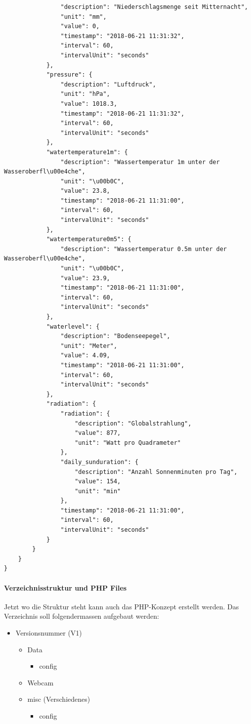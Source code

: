 \begin{lstlisting}
				"description": "Niederschlagsmenge seit Mitternacht",
				"unit": "mm",
				"value": 0,
				"timestamp": "2018-06-21 11:31:32",
				"interval": 60,
				"intervalUnit": "seconds"
			},
			"pressure": {
				"description": "Luftdruck",
				"unit": "hPa",
				"value": 1018.3,
				"timestamp": "2018-06-21 11:31:32",
				"interval": 60,
				"intervalUnit": "seconds"
			},
			"watertemperature1m": {
				"description": "Wassertemperatur 1m unter der Wasseroberfl\u00e4che",
				"unit": "\u00b0C",
				"value": 23.8,
				"timestamp": "2018-06-21 11:31:00",
				"interval": 60,
				"intervalUnit": "seconds"
			},
			"watertemperature0m5": {
				"description": "Wassertemperatur 0.5m unter der Wasseroberfl\u00e4che",
				"unit": "\u00b0C",
				"value": 23.9,
				"timestamp": "2018-06-21 11:31:00",
				"interval": 60,
				"intervalUnit": "seconds"
			},
			"waterlevel": {
				"description": "Bodenseepegel",
				"unit": "Meter",
				"value": 4.09,
				"timestamp": "2018-06-21 11:31:00",
				"interval": 60,
				"intervalUnit": "seconds"
			},
			"radiation": {
				"radiation": {
					"description": "Globalstrahlung",
					"value": 877,
					"unit": "Watt pro Quadrameter"
				},
				"daily_sunduration": {
					"description": "Anzahl Sonnenminuten pro Tag",
					"value": 154,
					"unit": "min"
				},
				"timestamp": "2018-06-21 11:31:00",
				"interval": 60,
				"intervalUnit": "seconds"
			}
		}
	}
}

\end{lstlisting}

\paragraph{Verzeichnisstruktur und PHP Files}

Jetzt wo die Struktur steht kann auch das PHP-Konzept erstellt werden. Das Verzeichnis soll folgendermassen aufgebaut werden:

\begin{itemize}
\item Versionsnummer (V1)
\begin{itemize}
\item Data
\begin{itemize}
\item config
\end{itemize}
\item Webcam
\item misc (Verschiedenes)
\begin{itemize}
\item config
\end{itemize}
\end{itemize}
\end{itemize}

